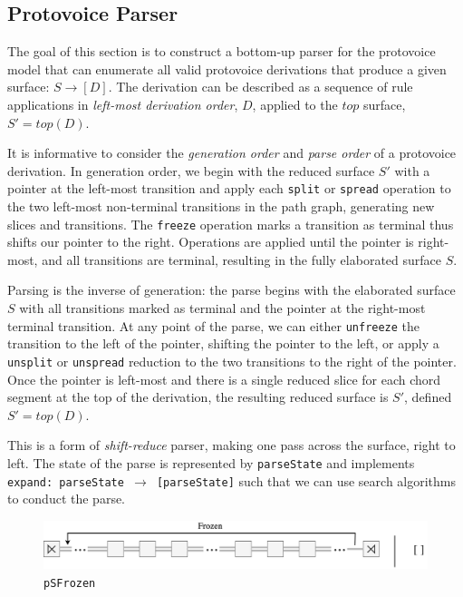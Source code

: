 \documentclass[12pt,a4paper,twoside,openright]{report}
\theoremstyle{definition}
\begin{document}
\subsection{Protovoice Parser}

The goal of this section is to construct a bottom-up parser for the protovoice model that can enumerate all valid protovoice derivations that produce a given surface: $S \to [D]$.
The derivation can be described as a sequence of rule applications in \textit{left-most derivation order}, $D$, applied to the $top$ surface, $S'=top(D)$.  

It is informative to consider the \textit{generation order} and \textit{parse order} of a protovoice derivation. 
In generation order, we begin with the reduced surface $S'$ with a pointer at the left-most transition and apply each \texttt{split} or \texttt{spread} operation to the two left-most non-terminal transitions in the path graph, generating new slices and transitions. The \texttt{freeze} operation marks a transition as terminal thus shifts our pointer to the right. Operations are applied until the pointer is right-most, and all transitions are terminal, resulting in the fully elaborated surface $S$.

Parsing is the inverse of generation: the parse begins with the elaborated surface $S$ with all transitions marked as terminal and the pointer at the right-most terminal transition. At any point of the parse, we can either \texttt{unfreeze} the transition to the left of the pointer, shifting the pointer to the left, or apply a \texttt{unsplit} or \texttt{unspread} reduction to the two transitions to the right of the pointer. Once the pointer is left-most and there is a single reduced slice for each chord segment at the top of the derivation, the resulting reduced surface is $S'$, defined $S' = top(D)$.

This is a form of \textit{shift-reduce} parser, making one pass across the surface, right to left. The state of the parse is represented by \texttt{parseState} and implements \texttt{expand: parseState $\to$ [parseState]} such that we can use search algorithms to conduct the parse.

\begin{figure}[h]
  \centering\includegraphics[width=\textwidth]{impl/parseState/frozen.png}
  \caption{\texttt{pSFrozen}}
  \label{fig:pSFrozen}
\end{figure}
\end{document}
